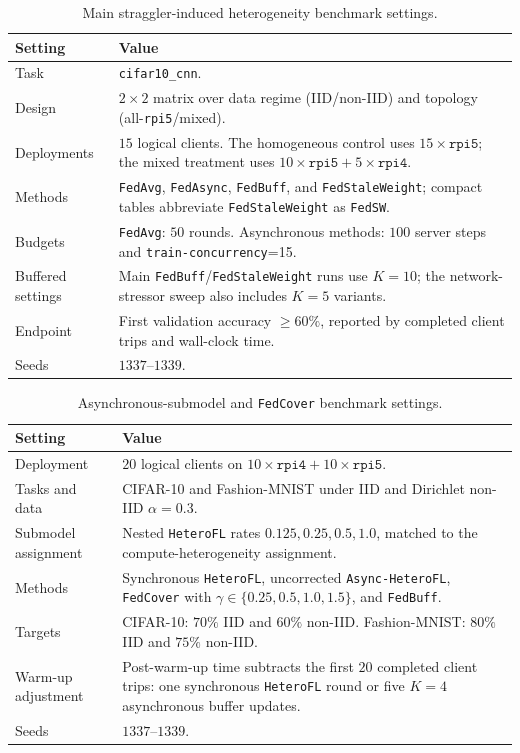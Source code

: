 \begin{table}[!htbp]
\centering
\caption{Main straggler-induced heterogeneity benchmark settings.}
\label{tab:appendix_straggler_settings}
\footnotesize
\begin{tabularx}{\textwidth}{>{\raggedright\arraybackslash}p{}X}
\toprule
Setting & Value \\
\midrule
Task & \texttt{cifar10\_cnn}. \\
Design & \(2\times2\) matrix over data regime (IID/non-IID) and topology (all-\texttt{rpi5}/mixed). \\
Deployments & \(15\) logical clients. The homogeneous control uses \(15\times\texttt{rpi5}\); the mixed treatment uses \(10\times\texttt{rpi5}+5\times\texttt{rpi4}\). \\
Methods & \texttt{FedAvg}, \texttt{FedAsync}, \texttt{FedBuff}, and \texttt{FedStaleWeight}; compact tables abbreviate \texttt{FedStaleWeight} as \texttt{FedSW}. \\
Budgets & \texttt{FedAvg}: \(50\) rounds. Asynchronous methods: \(100\) server steps and \texttt{train-concurrency}=15. \\
Buffered settings & Main \texttt{FedBuff}/\texttt{FedStaleWeight} runs use \(K=10\); the network-stressor sweep also includes \(K=5\) variants. \\
Endpoint & First validation accuracy \(\ge 60\%\), reported by completed client trips and wall-clock time. \\
Seeds & \(1337\)--\(1339\). \\
\bottomrule
\end{tabularx}
\end{table}

\begin{table}[!htbp]
\centering
\caption{Asynchronous-submodel and \texttt{FedCover} benchmark settings.}
\label{tab:appendix_fedcover_settings}
\footnotesize
\begin{tabularx}{\textwidth}{>{\raggedright\arraybackslash}p{}X}
\toprule
Setting & Value \\
\midrule
Deployment & \(20\) logical clients on \(10\times\texttt{rpi4}+10\times\texttt{rpi5}\). \\
Tasks and data & CIFAR-10 and Fashion-MNIST under IID and Dirichlet non-IID \(\alpha=0.3\). \\
Submodel assignment & Nested \texttt{HeteroFL} rates \(0.125,0.25,0.5,1.0\), matched to the compute-heterogeneity assignment. \\
Methods & Synchronous \texttt{HeteroFL}, uncorrected \texttt{Async-HeteroFL}, \texttt{FedCover} with \(\gamma\in\{0.25,0.5,1.0,1.5\}\), and \texttt{FedBuff}. \\
Targets & CIFAR-10: \(70\%\) IID and \(60\%\) non-IID. Fashion-MNIST: \(80\%\) IID and \(75\%\) non-IID. \\
Warm-up adjustment & Post-warm-up time subtracts the first \(20\) completed client trips: one synchronous \texttt{HeteroFL} round or five \(K=4\) asynchronous buffer updates. \\
Seeds & \(1337\)--\(1339\). \\
\bottomrule
\end{tabularx}
\end{table}


